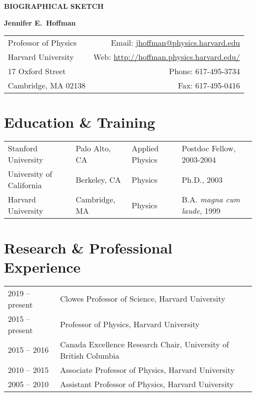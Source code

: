 \documentclass[12pt]{article}
\begin{document}
\pagestyle{CVfooter}

\noindent \textbf{\uppercase{Biographical Sketch}}
\vspace{2mm}

\noindent \textbf{Jennifer E.\ Hoffman}
\vspace{1mm}

\noindent\begin{tabular*}{\textwidth}{@{\extracolsep{\fill}}l r}
Professor of Physics & Email: \href{mailto:jhoffman@physics.harvard.edu}{jhoffman@physics.harvard.edu} \\
Harvard University & Web: \href{http://hoffman.physics.harvard.edu/}{http://hoffman.physics.harvard.edu/} \\
17 Oxford Street & Phone: 617-495-3734 \\
Cambridge, MA 02138 & Fax: 617-495-0416 \\
\hline
\end{tabular*}

\section{Education \& Training}

\begin{tabular}{l l l l}
Stanford University & Palo Alto, CA & Applied Physics & Postdoc Fellow, 2003-2004 \\
University of California & Berkeley, CA & Physics & Ph.D., 2003 \\
Harvard University & Cambridge, MA & Physics & B.A. \textit{magna cum laude}, 1999 \\
\end{tabular}

\section{Research \& Professional Experience}

\begin{tabular}{l l}
2019 -- present & Clowes Professor of Science, Harvard University \\
2015 -- present & Professor of Physics, Harvard University \\
2015 -- 2016 & Canada Excellence Research Chair, University of British Columbia \\
2010 -- 2015 & Associate Professor of Physics, Harvard University \\
2005 -- 2010 & Assistant Professor of Physics, Harvard University \\
\end{tabular}
\end{document}
